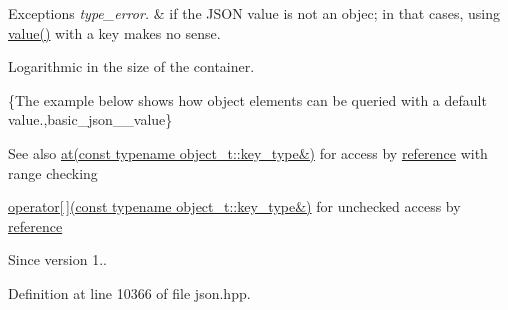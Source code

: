 \begin{DoxyExceptions}{Exceptions}
{\em type\+\_\+error.} & if the J\+S\+ON value is not an objec; in that cases, using {\ttfamily \hyperlink{classnlohmann_1_1basic__json_a9fa223b26419f018f9b18cc516e3a8e5}{value()}} with a key makes no sense.\\
\hline
\end{DoxyExceptions}
Logarithmic in the size of the container.

\{The example below shows how object elements can be queried with a default value.,basic\+\_\+json\+\_\+\+\_\+value\}

\begin{DoxySeeAlso}{See also}
\hyperlink{classnlohmann_1_1basic__json_a93403e803947b86f4da2d1fb3345cf2c}{at(const typename object\+\_\+t\+::key\+\_\+type\&)} for access by \hyperlink{classnlohmann_1_1basic__json_ac6a5eddd156c776ac75ff54cfe54a5bc}{reference} with range checking 

\hyperlink{classnlohmann_1_1basic__json_a233b02b0839ef798942dd46157cc0fe6}{operator\mbox{[}$\,$\mbox{]}(const typename object\+\_\+t\+::key\+\_\+type\&)} for unchecked access by \hyperlink{classnlohmann_1_1basic__json_ac6a5eddd156c776ac75ff54cfe54a5bc}{reference}
\end{DoxySeeAlso}
\begin{DoxySince}{Since}
version 1.. 
\end{DoxySince}


Definition at line 10366 of file json.\+hpp.

